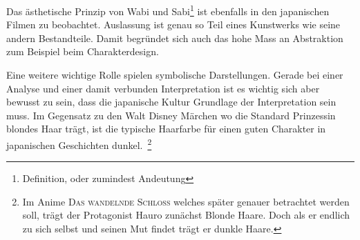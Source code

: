 Das ästhetische Prinzip von Wabi und Sabi\footnote{Definition, oder zumindest Andeutung} ist ebenfalls in den japanischen Filmen zu beobachtet. Auslassung ist genau so Teil eines Kunstwerks wie seine andern Bestandteile. Damit begründet sich auch das hohe Mass an Abstraktion zum Beispiel beim Charakterdesign.  

Eine weitere wichtige Rolle spielen symbolische Darstellungen. Gerade bei einer Analyse und einer damit verbunden Interpretation ist es wichtig sich aber bewusst zu sein, dass die japanische Kultur Grundlage der Interpretation sein muss. Im Gegensatz zu den Walt Disney Märchen wo die Standard Prinzessin blondes Haar trägt, ist die typische Haarfarbe für einen guten Charakter in japanischen Geschichten dunkel.~\footnote{Im Anime \textsc{Das wandelnde Schloss} welches später genauer betrachtet werden soll, trägt der Protagonist Hauro zunächst Blonde Haare. Doch als er endlich zu sich selbst und seinen Mut findet trägt er dunkle Haare.} 